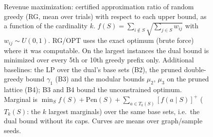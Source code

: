 \begin{figure}[t]
\centering
\setlength{\rgplotwidth}{0.49\columnwidth}
\\[1pt]
\hfill
\\
\hfill

\caption{Revenue maximization: certified approximation ratio of random greedy (RG, mean over trials) with respect to each upper bound, as a function of the cardinality $k$. $f(S)=\sum_{i\notin S}\sqrt{\sum_{j\in S} w_{ij}}$ with $w_{ij}\sim U(0,1)$. RG/OPT uses the exact optimum (brute force) where it was computable. On the largest instances the dual bound is minimized over every 5th or 10th greedy prefix only. Additional baselines: the LP over the dual's base sets (B2), the pruned double-greedy bound $\gamma_1$ (B3) and the modular bounds $\mu_2$, $\mu_3$ on the pruned lattice (B4); B3 and B4 bound the unconstrained optimum. Marginal is $\min_S f(S)+\mathrm{Pen}(S)+\sum_{a\in T_k(S)}[f(a\mid S)]^+$ ($T_k(S)$: the $k$ largest marginals) over the same base sets, i.e.\ the dual bound without its caps. Curves are means over graph/sample seeds.}
\label{fig:rg-revenue_max-baselines}
\end{figure}
